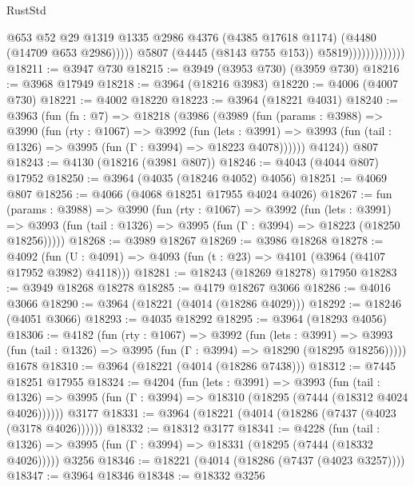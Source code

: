 \begin{lexlean}{RustStd}
\begin{coremodule}
                                    @653
                                    @52
                                    @29
                                    @1319
                                    @1335
                                    @2986
                                    @4376
                                    (@4385 @17618 @1174)
                                    (@4480 (@14709 @653 @2986)))))
                              @5807
                              (@4445 (@8143 @755 @153))
                              @5819)))))))))))))
@18211 := @3947 @730
@18215 := @3949 (@3953 @730) (@3959 @730)
@18216 := @3968 @17949
@18218 := @3964 (@18216 @3983)
@18220 := @4006 (@4007 @730)
@18221 := @4002 @18220
@18223 := @3964 (@18221 @4031)
@18240 := @3963
    (fun (fn : @7) =>
    @18218
      (@3986
        (@3989
          (fun (params : @3988) =>
          @3990
            (fun (rty : @1067) =>
            @3992
              (fun (lets : @3991) =>
              @3993 (fun (tail : @1326) => @3995 (fun (Γ : @3994) => @18223 @4078))))))
        @4124))
    @807
@18243 := @4130 (@18216 (@3981 @807))
@18246 := @4043 (@4044 @807) @17952
@18250 := @3964 (@4035 (@18246 @4052) @4056)
@18251 := @4069 @807
@18256 := @4066 (@4068 @18251 @17955 @4024 @4026)
@18267 := fun (params : @3988) =>
  @3990
    (fun (rty : @1067) =>
    @3992
      (fun (lets : @3991) =>
      @3993 (fun (tail : @1326) => @3995 (fun (Γ : @3994) => @18223 (@18250 @18256)))))
@18268 := @3989 @18267
@18269 := @3986 @18268
@18278 := @4092
    (fun (U : @4091) => @4093 (fun (t : @23) => @4101 (@3964 (@4107 @17952 @3982) @4118)))
@18281 := @18243 (@18269 @18278) @17950
@18283 := @3949 @18268 @18278
@18285 := @4179 @18267 @3066
@18286 := @4016 @3066
@18290 := @3964 (@18221 (@4014 (@18286 @4029)))
@18292 := @18246 (@4051 @3066)
@18293 := @4035 @18292
@18295 := @3964 (@18293 @4056)
@18306 := @4182
    (fun (rty : @1067) =>
    @3992
      (fun (lets : @3991) =>
      @3993 (fun (tail : @1326) => @3995 (fun (Γ : @3994) => @18290 (@18295 @18256)))))
    @1678
@18310 := @3964 (@18221 (@4014 (@18286 @7438)))
@18312 := @7445 @18251 @17955
@18324 := @4204
    (fun (lets : @3991) =>
    @3993
      (fun (tail : @1326) =>
      @3995 (fun (Γ : @3994) => @18310 (@18295 (@7444 (@18312 @4024 @4026))))))
    @3177
@18331 := @3964 (@18221 (@4014 (@18286 (@7437 (@4023 (@3178 @4026))))))
@18332 := @18312 @3177
@18341 := @4228
    (fun (tail : @1326) => @3995 (fun (Γ : @3994) => @18331 (@18295 (@7444 (@18332 @4026)))))
    @3256
@18346 := @18221 (@4014 (@18286 (@7437 (@4023 @3257))))
@18347 := @3964 @18346
@18348 := @18332 @3256

\end{coremodule}
\end{lexlean}
